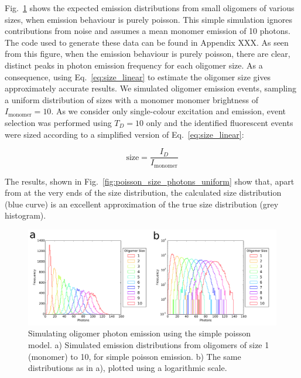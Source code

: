Fig.~\ref{fig:poisson_size_photons} shows the expected emission distributions from small oligomers of various sizes, when emission behaviour is purely poisson. This simple simulation ignores contributions from noise and assumes a mean monomer emission of 10 photons. The code used to generate these data can be found in Appendix XXX. As seen from this figure, when the emission behaviour is purely poisson, there are clear, distinct peaks in photon emission frequency for each oligomer size. As a consequence, using Eq.~\ref{eq:size_linear} to estimate the oligomer size gives approximately accurate results. We simulated oligomer emission events, sampling a uniform distribution of sizes with a monomer monomer brightness of $I_{\text{monomer}} = 10$. As we consider only single-colour excitation and emission, event selection was performed using $T_D = 10$ only and the identified fluorescent events were sized according to a simplified version of Eq.~\ref{eq:size_linear}:

\begin{equation}
\text{size} = \frac{I_D}{I_{\text{monomer}}}
\label{eq:size_linear_simple}
\end{equation}

The results, shown in Fig.~\ref{fig:poisson_size_photons_uniform} show that, apart from at the very ends of the size distribution, the calculated size distribution (blue curve) is an excellent approximation of the true size distribution (grey histogram).        

\begin{figure}
   \begin{center}
      \includegraphics*[clip=true, width=6in]{sizing/poisson_size_photons.pdf}
      \caption{Simulating oligomer photon emission using the simple poisson model. a) Simulated emission distributions from oligomers of size 1 (monomer) to 10, for simple poisson emission. b) The same distributions as in a), plotted using a logarithmic scale.}
      \label{fig:poisson_size_photons}
   \end{center}
\end{figure}


